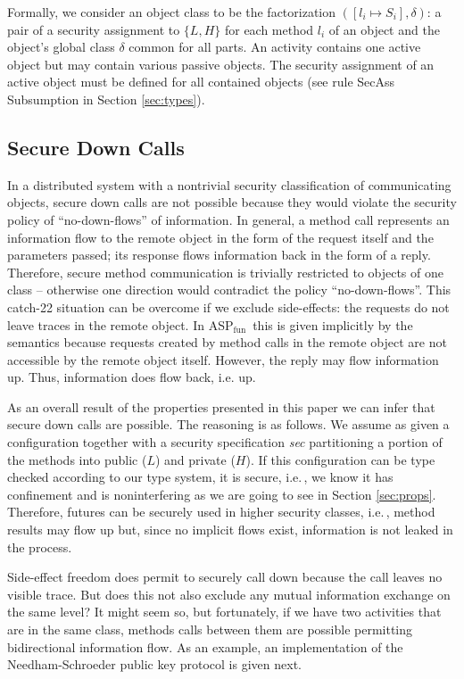 \documentclass[10pt, conference, compsocconf]{IEEEtran}
\newcommand\aspfun{ASP${}_\text{fun}$\ }
\newcommand\ie{i.e.\!\,, }
\begin{document}
{Formally, we consider an object class to be the factorization 
$([l_i \mapsto S_i], \delta)$: a pair of a security assignment
to $\{L,H\}$ for each method $l_i$ of an object and the object's global class $\delta$ common for all parts.
An activity contains one active object but may contain various passive
objects. 
The security assignment of an active object must be defined for all contained objects
(see rule {\sc SecAss Subsumption} in Section \ref{sec:types}).









\subsection{Secure Down Calls}
In a distributed system with a nontrivial security classification of communicating objects,
secure down calls are not possible because they would violate the security
policy of ``no-down-flows'' of information.
In general, a method call represents an information flow to the remote object
in the form of the request itself and the parameters passed; 
its response flows information back in the form of a reply.
Therefore, secure method communication is trivially restricted to objects of one class --
otherwise one direction would contradict the policy ``no-down-flows''.
This catch-22 situation can be overcome if we exclude side-effects: the requests do not leave traces in the remote object. 
In \aspfun this is given implicitly by the semantics because requests created by method 
calls in the remote object are not accessible by the remote object itself.
However, the reply may flow information up. Thus, information does flow back, i.e. up. 


As an overall result of the properties presented in this paper we can infer
that secure down calls are possible. The reasoning is as follows.
We assume as given a configuration together with a security specification {\it sec}
partitioning a portion of the methods into public ($L$) and private ($H$).
If this configuration can be type checked according to our type system, it is secure,
\ie we know it  has confinement and is noninterfering as we are going to see in Section
\ref{sec:props}. Therefore, futures can be securely used in higher
security classes, \ie method results may flow up but, since no implicit flows exist, 
information is not leaked in the process.

Side-effect freedom does permit to securely call down because the call leaves no visible trace.
But does this not also exclude any mutual information exchange on the same level? It might 
seem so, but fortunately,
if we have two activities that are in the same class, methods 
calls between them are possible permitting bidirectional information flow. As an example, an
implementation of the Needham-Schroeder public key protocol is given next.

}
\end{document}
